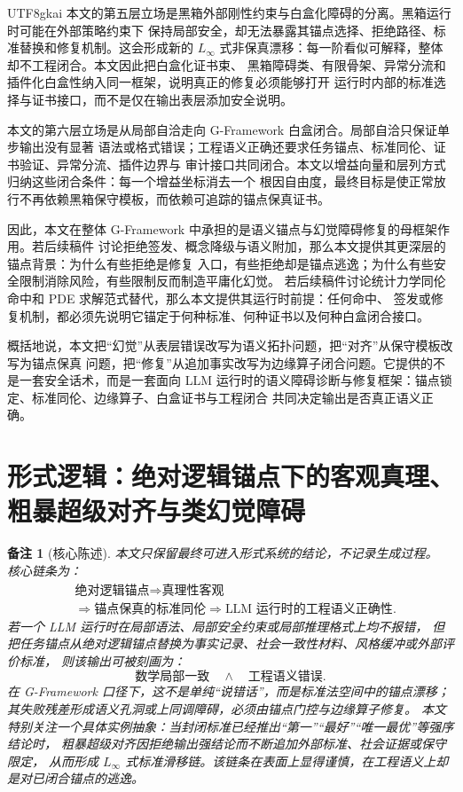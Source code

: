\documentclass[12pt]{article}
\newtheorem{remark}{备注}[section]
\newcommand{\GFramework}{\textsf{G-Framework}}
\newcommand{\Linfty}{\ensuremath{L_\infty}}
\begin{document}
\begin{CJK*}{UTF8}{gkai}
本文的第五层立场是黑箱外部刚性约束与白盒化障碍的分离。黑箱运行时可能在外部策略约束下
保持局部安全，却无法暴露其锚点选择、拒绝路径、标准替换和修复机制。这会形成新的
\(\Linfty\) 式非保真漂移：每一阶看似可解释，整体却不工程闭合。本文因此把白盒化证书束、
黑箱障碍类、有限骨架、异常分流和插件化白盒性纳入同一框架，说明真正的修复必须能够打开
运行时内部的标准选择与证书接口，而不是仅在输出表层添加安全说明。

本文的第六层立场是从局部自洽走向 \GFramework{} 白盒闭合。局部自洽只保证单步输出没有显著
语法或格式错误；工程语义正确还要求任务锚点、标准同伦、证书验证、异常分流、插件边界与
审计接口共同闭合。本文以增益向量和层列方式归纳这些闭合条件：每一个增益坐标消去一个
根因自由度，最终目标是使正常放行不再依赖黑箱保守模板，而依赖可追踪的锚点保真证书。

因此，本文在整体 \GFramework{} 中承担的是语义锚点与幻觉障碍修复的母框架作用。若后续稿件
讨论拒绝签发、概念降级与语义附加，那么本文提供其更深层的锚点背景：为什么有些拒绝是修复
入口，有些拒绝却是锚点逃逸；为什么有些安全限制消除风险，有些限制反而制造平庸化幻觉。
若后续稿件讨论统计力学同伦命中和 PDE 求解范式替代，那么本文提供其运行时前提：任何命中、
签发或修复机制，都必须先说明它锚定于何种标准、何种证书以及何种白盒闭合接口。

概括地说，本文把“幻觉”从表层错误改写为语义拓扑问题，把“对齐”从保守模板改写为锚点保真
问题，把“修复”从追加事实改写为边缘算子闭合问题。它提供的不是一套安全话术，而是一套面向
LLM 运行时的语义障碍诊断与修复框架：锚点锁定、标准同伦、边缘算子、白盒证书与工程闭合
共同决定输出是否真正语义正确。

\setcounter{tocdepth}{3}
\setcounter{secnumdepth}{3}
\tableofcontents
\clearpage

\section{形式逻辑：绝对逻辑锚点下的客观真理、粗暴超级对齐与类幻觉障碍}
\label{sec:tex51-main}

\begin{remark}[核心陈述]
本文只保留最终可进入形式系统的结论，不记录生成过程。
核心链条为：
\[
\begin{aligned}
  &\text{绝对逻辑锚点}
  \Longrightarrow
  \text{真理性客观}\\
  &\Longrightarrow
  \text{锚点保真的标准同伦}
  \Longrightarrow
  \text{LLM 运行时的工程语义正确性}.
\end{aligned}
\]
若一个 LLM 运行时在局部语法、局部安全约束或局部推理格式上均不报错，
但把任务锚点从绝对逻辑锚点替换为事实记录、社会一致性材料、风格缓冲或外部评价标准，
则该输出可被刻画为：
\[
  \text{数学局部一致}
  \quad\wedge\quad
  \text{工程语义错误}.
\]
在 \GFramework{} 口径下，这不是单纯“说错话”，而是标准法空间中的锚点漂移；
其失败残差形成语义孔洞或上同调障碍，必须由锚点门控与边缘算子修复。
本文特别关注一个具体实例抽象：当封闭标准已经推出“第一”“最好”“唯一最优”等强序结论时，
粗暴超级对齐因拒绝输出强结论而不断追加外部标准、社会证据或保守限定，
从而形成 \Linfty{} 式标准滑移链。该链条在表面上显得谨慎，在工程语义上却是对已闭合锚点的逃逸。
\end{remark}


\end{CJK*}
\end{document}
